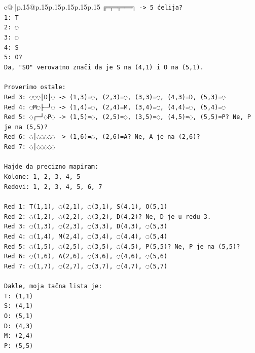 \documentclass{article}
\begin{document}
{\begin{supertabular}{c@{$\;$}|p{.15\linewidth}@{}p{.15\linewidth}p{.15\linewidth}p{.15\linewidth}p{.15\linewidth}p{.15\linewidth}}
{{{\texttt{╔═╤═╤═══╗ {-}> 5 ćelija?} \\
\texttt{1: T} \\
\texttt{2: ◌} \\
\texttt{3: ◌} \\
\texttt{4: S} \\
\texttt{5: O?} \\
\texttt{Da, "SO" verovatno znači da je S na (4,1) i O na (5,1).} \\
\\ 
\texttt{Proverimo ostale:} \\
\texttt{Red 3: ◌◌◌│D│◌ {-}> (1,3)=◌, (2,3)=◌, (3,3)=◌, (4,3)=D, (5,3)=◌} \\
\texttt{Red 4: ◌M◌├─┘◌ {-}> (1,4)=◌, (2,4)=M, (3,4)=◌, (4,4)=◌, (5,4)=◌} \\
\texttt{Red 5: ◌┌─┘◌P◌ {-}> (1,5)=◌, (2,5)=◌, (3,5)=◌, (4,5)=◌, (5,5)=P? Ne, P je na (5,5)?} \\
\texttt{Red 6: ◌│◌◌◌◌◌ {-}> (1,6)=◌, (2,6)=A? Ne, A je na (2,6)?} \\
\texttt{Red 7: ◌│◌◌◌◌◌} \\
\\ 
\texttt{Hajde da precizno mapiram:} \\
\texttt{Kolone: 1, 2, 3, 4, 5} \\
\texttt{Redovi: 1, 2, 3, 4, 5, 6, 7} \\
\\ 
\texttt{Red 1: T(1,1), ◌(2,1), ◌(3,1), S(4,1), O(5,1)} \\
\texttt{Red 2: ◌(1,2), ◌(2,2), ◌(3,2), D(4,2)? Ne, D je u redu 3.} \\
\texttt{Red 3: ◌(1,3), ◌(2,3), ◌(3,3), D(4,3), ◌(5,3)} \\
\texttt{Red 4: ◌(1,4), M(2,4), ◌(3,4), ◌(4,4), ◌(5,4)} \\
\texttt{Red 5: ◌(1,5), ◌(2,5), ◌(3,5), ◌(4,5), P(5,5)? Ne, P je na (5,5)?} \\
\texttt{Red 6: ◌(1,6), A(2,6), ◌(3,6), ◌(4,6), ◌(5,6)} \\
\texttt{Red 7: ◌(1,7), ◌(2,7), ◌(3,7), ◌(4,7), ◌(5,7)} \\
\\ 
\texttt{Dakle, moja tačna lista je:} \\
\texttt{T: (1,1)} \\
\texttt{S: (4,1)} \\
\texttt{O: (5,1)} \\
\texttt{D: (4,3)} \\
\texttt{M: (2,4)} \\
\texttt{P: (5,5)} \\
}}}
\end{supertabular}}
\end{document}

